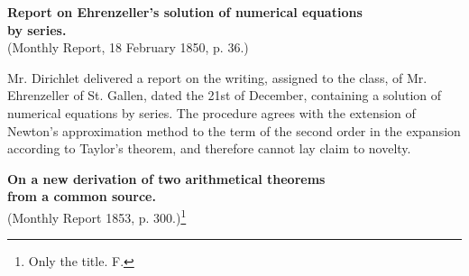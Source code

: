 \documentclass[11pt]{article}
\begin{document}
\bigskip
\begin{center}
{\large \textbf{Report on Ehrenzeller's solution of numerical equations}}\\
{\large \textbf{by series.}}\\
{\small (Monthly Report, 18 February 1850, p. 36.)}
\end{center}

Mr. Dirichlet delivered a report on the writing, assigned to the class, of Mr. Ehrenzeller of St. Gallen, dated the 21st of December, containing a solution of numerical equations by series. The procedure agrees with the extension of Newton's approximation method to the term of the second order in the expansion according to Taylor's theorem, and therefore cannot lay claim to novelty.

\vspace{2em}
\begin{center}
{\large \textbf{On a new derivation of two arithmetical theorems}}\\
{\large \textbf{from a common source.}}\\
{\small (Monthly Report 1853, p. 300.)\footnote{Only the title. \textnormal{F.}}}
\end{center}
\end{document}
